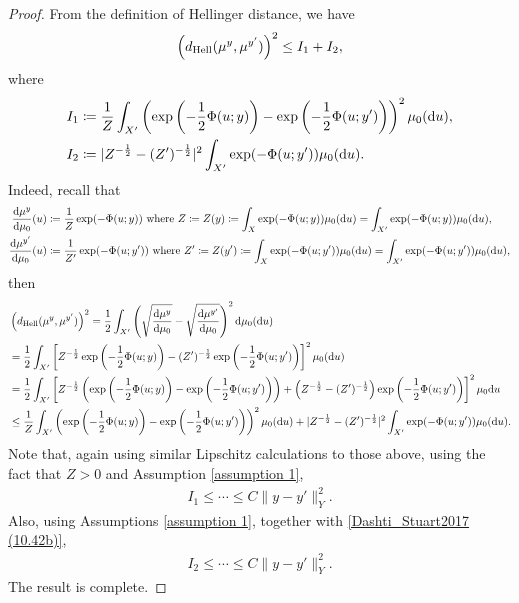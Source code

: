 \documentclass[oneside,11pt]{book}
\numberwithin{equation}{section}
\begin{document}
\begin{proof}
    From the definition of Hellinger distance, we have
    \begin{align*}
        \left(d_{\rm Hell}(\mu^y,\mu^{y'})\right)^2\le I_1 + I_2,
    \end{align*}
    where
    \begin{align*}
        I_1&\coloneqq\frac{1}{Z}\int_{X'} \left(\exp\left(-\frac{1}{2}\Phi(u;y)\right) - \exp\left(-\frac{1}{2}\Phi(u;y')\right)\right)^2\mu_0({\rm d}u),\\
        I_2&\coloneqq|Z^{-\frac{1}{2}} - (Z')^{-\frac{1}{2}}|^2\int_{X'} \exp(-\Phi(u;y'))\mu_0({\rm d}u).
    \end{align*}
    Indeed, recall that
    \begin{align*}
        \frac{{\rm d}\mu^y}{{\rm d}\mu_0}(u)&\coloneqq\frac{1}{Z}\exp(-\Phi(u;y))\mbox{ where } Z\coloneqq Z(y)\coloneqq\int_X \exp(-\Phi(u;y))\mu_0({\rm d}u) = \int_{X'} \exp(-\Phi(u;y))\mu_0({\rm d}u),\\
        \frac{{\rm d}\mu^{y'}}{{\rm d}\mu_0}(u)&\coloneqq\frac{1}{Z'}\exp(-\Phi(u;y'))\mbox{ where } Z'\coloneqq Z(y')\coloneqq\int_X \exp(-\Phi(u;y'))\mu_0({\rm d}u) = \int_{X'} \exp(-\Phi(u;y'))\mu_0({\rm d}u),
    \end{align*}
    then
    \begin{align*}
        &\left(d_{\rm Hell}(\mu^y,\mu^{y'})\right)^2 = \frac{1}{2}\int_{X'} \left(\sqrt{\frac{{\rm d}\mu^y}{{\rm d}\mu_0}} - \sqrt{\frac{{\rm d}\mu^{y'}}{{\rm d}\mu_0}}\right)^2{\rm d}\mu_0({\rm d}u)\\
        &= \frac{1}{2}\int_{X'} \left[Z^{-\frac{1}{2}}\exp\left(-\frac{1}{2}\Phi(u;y)\right) - (Z')^{-\frac{1}{2}}\exp\left(-\frac{1}{2}\Phi(u;y')\right)\right]^2\mu_0({\rm d}u)\\
        &= \frac{1}{2}\int_{X'} \left[Z^{-\frac{1}{2}}\left(\exp\left(-\frac{1}{2}\Phi(u;y)\right) - \exp\left(-\frac{1}{2}\Phi(u;y')\right)\right) + \left(Z^{-\frac{1}{2}} - (Z')^{-\frac{1}{2}}\right)\exp\left(-\frac{1}{2}\Phi(u;y')\right)\right]^2\mu_0{\rm d}u\\
        &\le\frac{1}{Z}\int_{X'} \left(\exp\left(-\frac{1}{2}\Phi(u;y)\right) - \exp\left(-\frac{1}{2}\Phi(u;y')\right)\right)^2\mu_0({\rm d}u) + |Z^{-\frac{1}{2}} - (Z')^{-\frac{1}{2}}|^2\int_{X'} \exp(-\Phi(u;y'))\mu_0({\rm d}u).
    \end{align*}
    Note that, again using similar Lipschitz calculations to those above, using the fact that $Z > 0$ and Assumption \ref{assumption 1},
    \begin{align*}
        I_1\le\cdots\le C\|y - y'\|_Y^2.
    \end{align*}
    Also, using Assumptions \ref{assumption 1}, together with \ref{Dashti_Stuart2017 (10.42b)},
    \begin{align*}
        I_2\le\cdots\le C\|y - y'\|_Y^2.
    \end{align*}
    The result is complete.
\end{proof}
\end{document}
